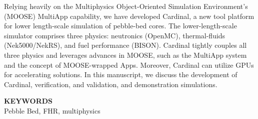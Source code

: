 \documentclass[11pt,letterpaper,english]{article}
\begin{document}
Relying heavily on the Multiphysics Object-Oriented Simulation Environment's (MOOSE) MultiApp capability, we have developed Cardinal, a new tool platform for lower length-scale simulation of pebble-bed cores. The lower-length-scale simulator comprises three physics: neutronics (OpenMC), thermal-fluids (Nek5000/NekRS), and fuel performance (BISON).   Cardinal tightly couples all three physics and leverages advances in MOOSE, such as the MultiApp system and the concept of MOOSE-wrapped Apps. Moreover, Cardinal can utilize GPUs for accelerating solutions. In this manuscript, we discuss the development of Cardinal, verification, and validation, and demonstration simulations.

\begin{flushright}
{\bf KEYWORDS} \\
Pebble Bed, FHR, multiphysics
\end{flushright}

\doublespacing








%

%
%
%

%

\begin{center}
\scriptsize
{}
\normalsize
\end{center}
\end{document}
